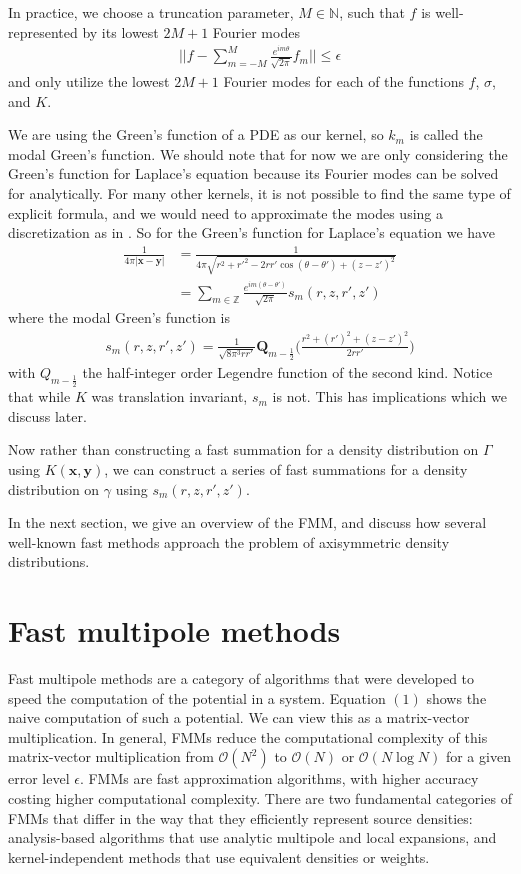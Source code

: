 \documentclass[11pt, oneside]{article}   	%
\begin{document}
In practice, we choose a truncation parameter, $M\in\mathbb{N}$, such that $f$ is well-represented by its lowest $2M+1$ Fourier modes
\begin{align}
||f-\sum\limits_{m=-M}^{M}\frac{e^{im\theta}}{\sqrt{2\pi}}f_m||\le\epsilon
\end{align}
and only utilize the lowest $2M+1$ Fourier modes for each of the functions $f$, $\sigma$, and $K$.

We are using the Green's function of a PDE as our kernel, so $k_m$ is called the modal Green's function. We should note that for now we are only considering the Green's function for Laplace's equation because its Fourier modes can be solved for analytically. For many other kernels, it is not possible to find the same type of explicit formula, and we would need to approximate the modes using a discretization as in \cite{YYM}. So for the Green's function for Laplace's equation we have
\begin{align}
\frac{1}{4\pi |\mathbf{x}-\mathbf{y}|} &=\frac{1}{4\pi\sqrt{r^2+r'^2-2rr'\cos{(\theta-\theta')}+(z-z')^2}}\\
&= \sum_{m\in\mathbb{Z}} \frac{e^{im(\theta-\theta')}}{\sqrt{2\pi}} s_m(r,z,r',z')
\end{align}
where the modal Green's function is
\begin{align}
s_m(r,z,r',z')=\frac{1}{\sqrt{8\pi^3 rr'}}\mathbf{Q}_{m-\frac{1}{2}}\bigg(\frac{r^2+(r')^2+(z-z')^2}{2rr'}\bigg)
\end{align}
with $Q_{m-\frac{1}{2}}$ the half-integer order Legendre function of the second kind. Notice that while $K$ was translation invariant, $s_m$ is not. This has implications which we discuss later.

Now rather than constructing a fast summation for a density distribution on $\Gamma$ using $K(\mathbf{x},\mathbf{y})$, we can construct a series of fast summations for a density distribution on $\gamma$ using $s_m(r,z,r',z')$.

In the next section, we give an overview of the FMM, and discuss how several well-known fast methods approach the problem of axisymmetric density distributions.

\section{Fast multipole methods}
Fast multipole methods are a category of algorithms that were developed to speed the computation of the potential in a system. Equation $(1)$ shows the naive computation of such a potential. We can view this as a matrix-vector multiplication. In general, FMMs reduce the computational complexity of this matrix-vector multiplication from $\mathcal{O}(N^2)$ to $\mathcal{O}(N)$ or $\mathcal{O}(N\log N)$ for a given error level $\epsilon$. FMMs are fast approximation algorithms, with higher accuracy costing higher computational complexity. There are two fundamental categories of FMMs that differ in the way that they efficiently represent source densities: analysis-based algorithms that use analytic multipole and local expansions, and kernel-independent methods that use equivalent densities or weights.
\end{document}
